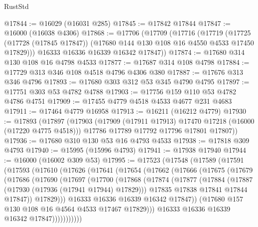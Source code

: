 \begin{lexlean}{RustStd}
\begin{coremodule}
@17844 := @16029 (@16031 @285)
@17845 := @17842 @17844
@17847 := @16000 (@16038 @4306)
@17868 := @17706
    (@17709
      (@17716
        (@17719
          (@17725 (@17728 (@17845 @17847)) (@17680 @144 @130 @108 @16 @4550 @4533 @17450 @17829)))
        @16333
        @16336
        @16339
        @16342
        @17847))
@17874 := @17680 @314 @130 @108 @16 @4798 @4533
@17877 := @17687 @314 @108 @4798
@17884 := @17729 @313 @346 @108 @4518 @4796 @4306 @380
@17887 := @17676 @313 @346 @4796
@17893 := @17680 @303 @312 @53 @345 @4790 @4795
@17897 := @17751 @303 @53 @4782 @4788
@17903 := @17756 @159 @110 @53 @4782 @4786 @4751
@17909 := @17455 @4779 @4518 @4533 @4677 @231 @4683
@17911 := @17464 @4779 @16958
@17913 := @16211 (@16212 @4779)
@17930 := @17893
    (@17897
      (@17903
        (@17909 (@17911 @17913) @17470 @17218 (@16000 (@17220 @4775 @4518)))
        @17786
        @17789
        @17792
        @17796
        @17801
        @17807))
@17936 := @17680 @310 @130 @53 @16 @4793 @4533
@17938 := @17818 @309 @4793
@17940 := @15995 (@15996 @4793)
@17941 := @17938 @17940
@17944 := @16000 (@16002 @309 @53)
@17995 := @17523
    (@17548
      (@17589
        (@17591
          (@17593
            (@17610
              (@17626
                (@17641
                  (@17654
                    (@17662
                      (@17666
                        (@17675
                          (@17679
                            (@17686
                              (@17690
                                (@17697
                                  (@17700
                                    (@17868
                                      (@17874
                                        (@17877
                                          (@17884
                                            (@17887 (@17930 (@17936 (@17941 @17944) @17829)))
                                            @17835
                                            @17838
                                            @17841
                                            @17844
                                            @17847))
                                        @17829)))
                                  @16333
                                  @16336
                                  @16339
                                  @16342
                                  @17847))
                              (@17680 @157 @130 @108 @16 @4564 @4533 @17467 @17829)))
                          @16333
                          @16336
                          @16339
                          @16342
                          @17847)))))))))))

\end{coremodule}
\end{lexlean}
